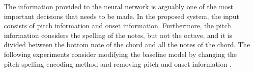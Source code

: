
The information provided to the neural network is arguably
one of the most important decisions that needs to be made.
In the proposed system, the input consists of pitch
information and onset information. Furthermore, the pitch
information considers the spelling of the notes, but not the
octave, and it is divided between the bottom note of the
chord and all the notes of the chord. The following
experiments consider modifying the baseline model by
changing the pitch spelling encoding method
 and removing
pitch and onset information .
